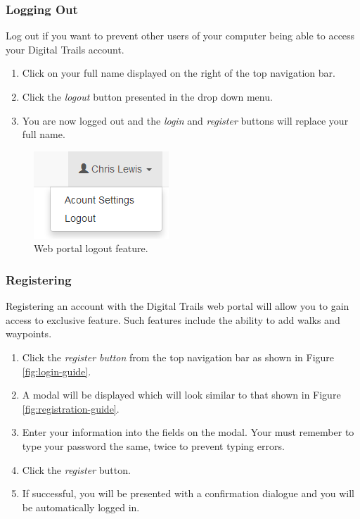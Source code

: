 \documentclass[11pt,a4paper]{report}
\begin{document}
\subsubsection{Logging Out}

Log out if you want to prevent other users of your computer being able to access your Digital Trails account.

\begin{enumerate}
\item Click on your full name displayed on the right of the top navigation bar.
\item Click the \emph{logout} button presented in the drop down menu.
\item You are now logged out and the \emph{login} and \emph{register} buttons will replace your full name.
\end{enumerate}

\begin{figure}[h]
\centering
\includegraphics[width=0.4\linewidth]{./img/webportal-guide/logout}
\caption{Web portal logout feature.}
\label{fig:logout}
\end{figure}

\subsubsection{Registering}

Registering an account with the Digital Trails web portal will allow you to gain access to exclusive feature. Such features include the ability to add walks and waypoints.

\begin{enumerate}
\item Click the \emph{register button} from the top navigation bar as shown in Figure \ref{fig:login-guide}.
\item A modal will be displayed which will look similar to that shown in Figure \ref{fig:registration-guide}.
\item Enter your information into the fields on the modal. Your must remember to type your password the same, twice to prevent typing errors.
\item Click the \emph{register} button.
\item If successful, you will be presented with a confirmation dialogue and you will be automatically logged in.
\end{enumerate}
\end{document}
